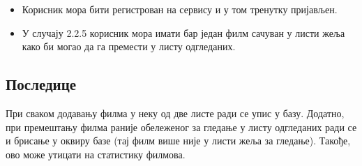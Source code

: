 \begin{itemize}
    \item Корисник мора бити регистрован на сервису и у том тренутку пријављен. 
    \item У случају 2.2.5 корисник мора имати бар један филм сачуван у листи жеља како би могао 
    да га премести у листу одгледаних.
\end{itemize}

\subsection{Последице}

При сваком додавању филма у неку од две листе ради се упис у базу. Додатно, при премештању филма раније 
обележеног за гледање у листу одгледаних ради се и брисање у оквиру базе (тај филм више није у листи жеља за гледање).
Такође, ово може утицати на статистику филмова.

